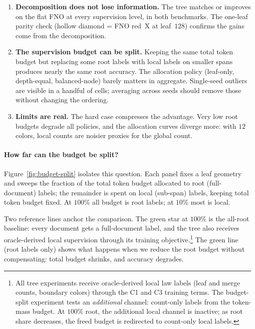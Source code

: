 \begin{enumerate}[leftmargin=1.5em]
    \item \textbf{Decomposition does not lose information.} The tree matches or improves on the flat FNO at every supervision level, in both benchmarks. The one-leaf parity check (hollow diamond = FNO red~X at leaf~$128$) confirms the gains come from the decomposition.
    \item \textbf{The supervision budget can be split.} Keeping the same total token budget but replacing some root labels with local labels on smaller spans produces nearly the same root accuracy. The allocation policy (leaf-only, depth-equal, balanced-node) barely matters in aggregate. Single-seed outliers are visible in a handful of cells; averaging across seeds should remove those without changing the ordering.
    \item \textbf{Limits are real.} The hard case compresses the advantage. Very low root budgets degrade all policies, and the allocation curves diverge more: with $12$ colors, local counts are noisier proxies for the global count.
\end{enumerate}

\paragraph{How far can the budget be split?}
Figure~\ref{fig:budget-split} isolates this question. Each panel fixes a leaf geometry and sweeps the fraction of the total token budget allocated to root (full-document) labels; the remainder is spent on local (sub-span) labels, keeping total token budget fixed. At $100\%$ all budget is root labels; at $10\%$ most is local.

Two reference lines anchor the comparison. The green star at $100\%$ is the all-root baseline: every document gets a full-document label, and the tree also receives oracle-derived local supervision through its training objective.\footnote{All tree experiments receive oracle-derived local law labels (leaf and merge counts, boundary colors) through the C1 and C3 training terms. The budget-split experiment tests an \emph{additional} channel: count-only labels from the token-mass budget. At $100\%$ root, the additional local channel is inactive; as root share decreases, the freed budget is redirected to count-only local labels.} The green line (root labels only) shows what happens when we reduce the root budget without compensating: total budget shrinks, and accuracy degrades.


